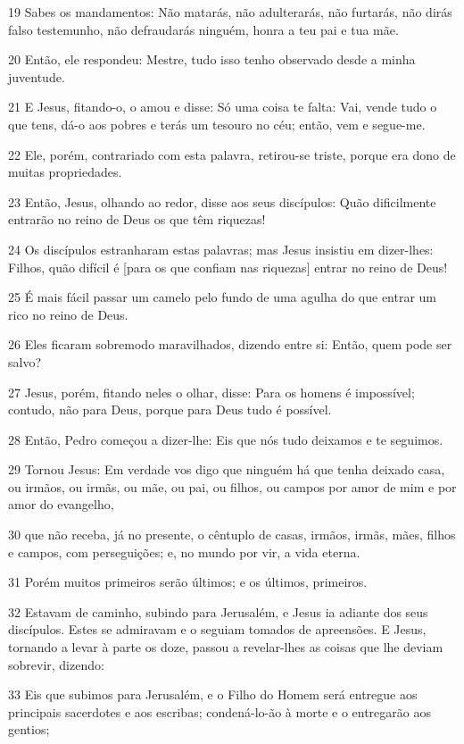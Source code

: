 \par 19 Sabes os mandamentos: Não matarás, não adulterarás, não furtarás, não dirás falso testemunho, não defraudarás ninguém, honra a teu pai e tua mãe.
\par 20 Então, ele respondeu: Mestre, tudo isso tenho observado desde a minha juventude.
\par 21 E Jesus, fitando-o, o amou e disse: Só uma coisa te falta: Vai, vende tudo o que tens, dá-o aos pobres e terás um tesouro no céu; então, vem e segue-me.
\par 22 Ele, porém, contrariado com esta palavra, retirou-se triste, porque era dono de muitas propriedades.
\par 23 Então, Jesus, olhando ao redor, disse aos seus discípulos: Quão dificilmente entrarão no reino de Deus os que têm riquezas!
\par 24 Os discípulos estranharam estas palavras; mas Jesus insistiu em dizer-lhes: Filhos, quão difícil é [para os que confiam nas riquezas] entrar no reino de Deus!
\par 25 É mais fácil passar um camelo pelo fundo de uma agulha do que entrar um rico no reino de Deus.
\par 26 Eles ficaram sobremodo maravilhados, dizendo entre si: Então, quem pode ser salvo?
\par 27 Jesus, porém, fitando neles o olhar, disse: Para os homens é impossível; contudo, não para Deus, porque para Deus tudo é possível.
\par 28 Então, Pedro começou a dizer-lhe: Eis que nós tudo deixamos e te seguimos.
\par 29 Tornou Jesus: Em verdade vos digo que ninguém há que tenha deixado casa, ou irmãos, ou irmãs, ou mãe, ou pai, ou filhos, ou campos por amor de mim e por amor do evangelho,
\par 30 que não receba, já no presente, o cêntuplo de casas, irmãos, irmãs, mães, filhos e campos, com perseguições; e, no mundo por vir, a vida eterna.
\par 31 Porém muitos primeiros serão últimos; e os últimos, primeiros.
\par 32 Estavam de caminho, subindo para Jerusalém, e Jesus ia adiante dos seus discípulos. Estes se admiravam e o seguiam tomados de apreensões. E Jesus, tornando a levar à parte os doze, passou a revelar-lhes as coisas que lhe deviam sobrevir, dizendo:
\par 33 Eis que subimos para Jerusalém, e o Filho do Homem será entregue aos principais sacerdotes e aos escribas; condená-lo-ão à morte e o entregarão aos gentios;
